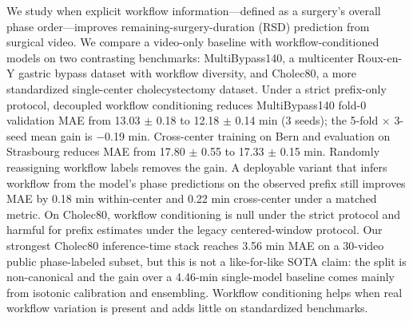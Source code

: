 We study when explicit workflow information---defined as a surgery's
overall phase order---improves remaining-surgery-duration (RSD) prediction
from surgical video. We compare a video-only baseline with
workflow-conditioned models on two contrasting benchmarks: MultiBypass140,
a multicenter Roux-en-Y gastric bypass dataset with workflow diversity, and
Cholec80, a more standardized single-center cholecystectomy dataset. Under
a strict prefix-only protocol, decoupled workflow conditioning reduces
MultiBypass140 fold-0 validation MAE from 13.03 $\pm$ 0.18 to 12.18 $\pm$
0.14 min (3 seeds); the 5-fold $\times$ 3-seed mean gain is $-$0.19 min.
Cross-center training on Bern and evaluation on Strasbourg reduces MAE from
17.80 $\pm$ 0.55 to 17.33 $\pm$ 0.15 min. Randomly reassigning workflow
labels removes the gain. A deployable variant that infers workflow from the
model's phase predictions on the observed prefix still improves MAE by 0.18
min within-center and 0.22 min cross-center under a matched metric. On
Cholec80, workflow conditioning is null under the strict protocol and
harmful for prefix estimates under the legacy centered-window protocol. Our
strongest Cholec80 inference-time stack reaches 3.56 min MAE on a 30-video
public phase-labeled subset, but this is not a like-for-like SOTA claim: the
split is non-canonical and the gain over a 4.46-min single-model baseline
comes mainly from isotonic calibration and ensembling. Workflow conditioning
helps when real workflow variation is present and adds little on standardized
benchmarks.
